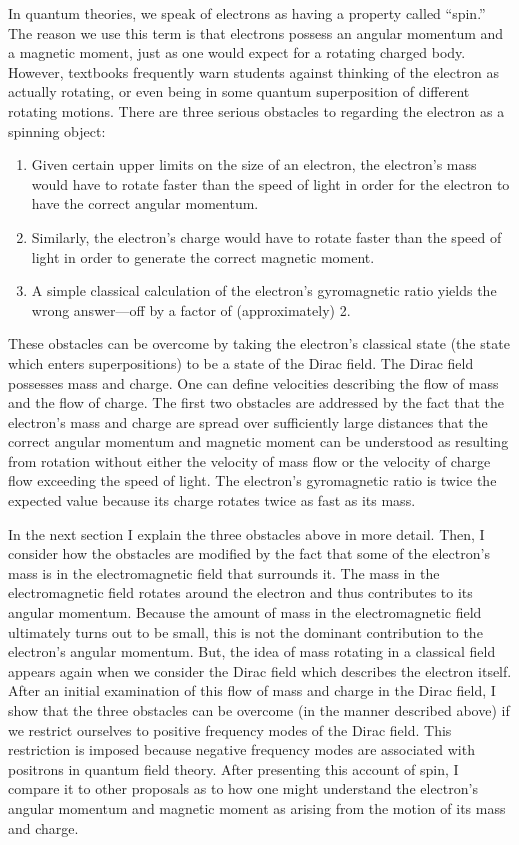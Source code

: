 \documentclass[onecolumn,secnumarabic,amsmath,amssymb,balancelastpage,nofootinbib]{article}
\begin{document}
In quantum theories, we speak of electrons as having a property called ``spin.''  The reason we use this term is that electrons possess an angular momentum and a magnetic moment, just as one would expect for a rotating charged body.  However, textbooks frequently warn students against thinking of the electron as actually rotating, or even being in some quantum superposition of different rotating motions.  There are three serious obstacles to regarding the electron as a spinning object:
\begin{enumerate}
\item Given certain upper limits on the size of an electron, the electron's mass would have to rotate faster than the speed of light in order for the electron to have the correct angular momentum.
\item Similarly, the electron's charge would have to rotate faster than the speed of light in order to generate the correct magnetic moment.
\item A simple classical calculation of the electron's gyromagnetic ratio yields the wrong answer---off by a factor of (approximately) 2.
\end{enumerate}
These obstacles can be overcome by taking the electron's classical state (the state which enters superpositions) to be a state of the Dirac field.  The Dirac field possesses mass and charge.  One can define velocities describing the flow of mass and the flow of charge.  The first two obstacles are addressed by the fact that the electron's mass and charge are spread over sufficiently large distances that the correct angular momentum and magnetic moment can be understood as resulting from rotation without either the velocity of mass flow or the velocity of charge flow exceeding the speed of light.  The electron's gyromagnetic ratio is twice the expected value because its charge rotates twice as fast as its mass.

In the next section I explain the three obstacles above in more detail.  Then, I consider how the obstacles are modified by the fact that some of the electron's mass is in the electromagnetic field that surrounds it.  The mass in the electromagnetic field rotates around the electron and thus contributes to its angular momentum.  Because the amount of mass in the electromagnetic field ultimately turns out to be small, this is not the dominant contribution to the electron's angular momentum.  But, the idea of mass rotating in a classical field appears again when we consider the Dirac field which describes the electron itself.  After an initial examination of this flow of mass and charge in the Dirac field, I show that the three obstacles can be overcome (in the manner described above) if we restrict ourselves to positive frequency modes of the Dirac field.  This restriction is imposed because negative frequency modes are associated with positrons in quantum field theory.  After presenting this account of spin, I compare it to other proposals as to how one might understand the electron's angular momentum and magnetic moment as arising from the motion of its mass and charge.
\end{document}
